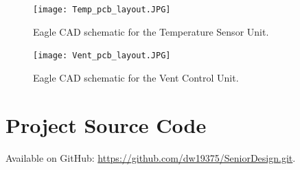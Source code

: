 \begin{figure}[htb]
\centering
\texttt{[image: Temp\_pcb\_layout.JPG]}
\caption{Eagle CAD schematic for the Temperature Sensor Unit.}
\label{fig:Temperature_PCB}
\end{figure}

\begin{figure}[htb]
\centering
\texttt{[image: Vent\_pcb\_layout.JPG]}
\caption{Eagle CAD schematic for the Vent Control Unit.}
\label{fig:Vent_PCB}
\end{figure}

\section{Project Source Code}
Available on GitHub: \url{https://github.com/dw19375/SeniorDesign.git}.
